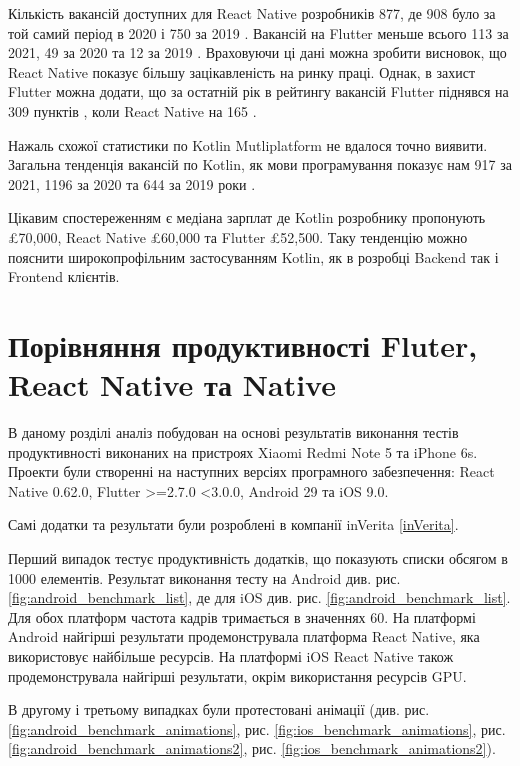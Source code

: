 Кількість вакансій доступних для React Native розробників 877, де 908 було за той самий період в 2020 і 750 за 2019 \cite{react_native_jobs}.
Вакансій на Flutter меньше всього 113 за 2021, 49 за 2020 та 12 за 2019 \cite{flutter_jobs}.
Враховуючи ці дані можна зробити висновок, що React Native показує більшу зацікавленість на ринку праці.
Однак, в захист Flutter можна додати, що за остатній рік в рейтингу вакансій Flutter піднявся на 309 пунктів \cite{flutter_jobs}, коли React Native на 165 \cite{react_native_jobs}.

Нажаль схожої статистики по Kotlin Mutliplatform не вдалося точно виявити.
Загальна тенденція вакансій по Kotlin, як мови програмування показує нам 917 за 2021, 1196 за 2020 та 644 за 2019 роки \cite{kotlin_jobs}.

Цікавим спостереженням є медіана зарплат де Kotlin розробнику пропонують £70,000\cite{kotlin_jobs}, React Native £60,000\cite{react_native_jobs} та Flutter £52,500\cite{flutter_jobs}.
Таку тенденцію можно пояснити широкопрофільним застосуванням Kotlin, як в розробці Backend так і Frontend клієнтів.


\section{Порівняння продуктивності Fluter, React Native та Native}
\label{sec:benchmarking}

В даному розділі аналіз побудован на основі результатів виконання тестів продуктивності виконаних на пристроях Xiaomi Redmi Note 5 та iPhone 6s.
Проекти були створенні на наступних версіях програмного забезпечення: React Native 0.62.0, Flutter >=2.7.0 <3.0.0, Android 29 та iOS 9.0.

Самі додатки та результати були розроблені в компанії inVerita \ref{inVerita}.

Перший випадок тестує продуктивність додатків, що показують списки обсягом в 1000 елементів.
Результат виконання тесту на Android див. рис. \ref{fig:android_benchmark_list}, де
для iOS див. рис. \ref{fig:android_benchmark_list}.
Для обох платформ частота кадрів тримається в значеннях 60.
На платформі Android найгірші результати продемонструвала платформа React Native, яка використовує найбільше ресурсів.
На платформі iOS React Native також продемонструвала найгірші результати, окрім використання ресурсів GPU.

В другому і третьому випадках були протестовані анімації (див. рис.
\ref{fig:android_benchmark_animations}, рис. \ref{fig:ios_benchmark_animations},
рис. \ref{fig:android_benchmark_animations2}, рис. \ref{fig:ios_benchmark_animations2}).

